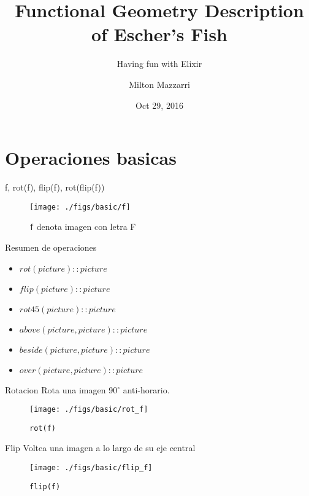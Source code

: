 \documentclass{beamer}
\title{Functional Geometry Description of Escher's Fish}
\subtitle{Having fun with Elixir}
\date{Oct 29, 2016}
\author{Milton Mazzarri}
\institute{Mexico City Erlang Factory 2016}
\begin{document}
    \maketitle

    \section{Operaciones basicas}

    \begin{frame}{f, rot(f), flip(f), rot(flip(f))}

        \begin{figure}
            \centering
            \texttt{[image: ./figs/basic/f]}
            \caption{\texttt{f} denota imagen con letra F}
            \label{fig:f}
        \end{figure}

    \end{frame}

    \begin{frame}{Resumen de operaciones}

        \begin{itemize}[<+- | alert@+>]
            \item $rot(picture) :: picture$
            \item $flip(picture) :: picture$
            \item $rot45(picture) :: picture$
            \item $above(picture, picture) :: picture$
            \item $beside(picture, picture) :: picture$
            \item $over(picture, picture) :: picture$
        \end{itemize}

    \end{frame}

    \begin{frame}{Rotacion}
        Rota una imagen 90$^{\circ}$ anti-horario.

        \begin{figure}
            \centering
            \texttt{[image: ./figs/basic/rot\_f]}
            \caption{\texttt{rot(f)}}
            \label{fig:rot_f}
        \end{figure}
    \end{frame}

    \begin{frame}{Flip}
        Voltea una imagen a lo largo de su eje central

        \begin{figure}
            \centering
            \texttt{[image: ./figs/basic/flip\_f]}
            \caption{\texttt{flip(f)}}
            \label{fig:flip_f}
        \end{figure}
    \end{frame}
\end{document}
